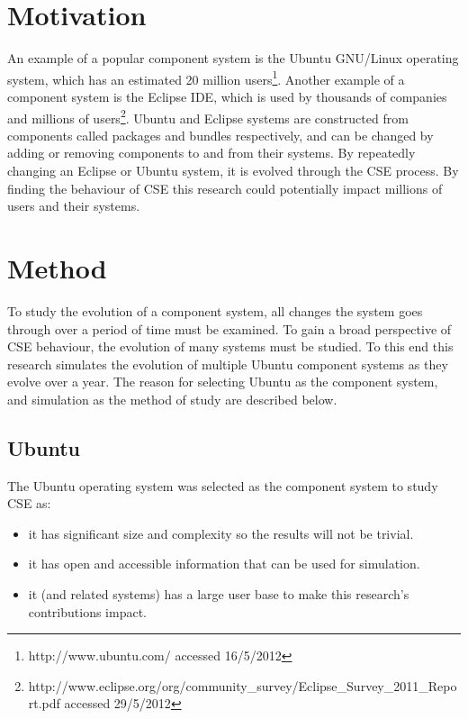 \section{Motivation}
An example of a popular component system is the Ubuntu GNU/Linux operating system, which has an estimated 20 million users\footnote{http://www.ubuntu.com/ accessed 16/5/2012}. 
Another example of a component system is the Eclipse IDE, which is used by thousands of companies and millions of users\footnote{http://www.eclipse.org/org/community\_survey/Eclipse\_Survey\_2011\_Report.pdf  accessed 29/5/2012}.
Ubuntu and Eclipse systems are constructed from components called packages and bundles respectively, 
and can be changed by adding or removing components to and from their systems.
By repeatedly changing an Eclipse or Ubuntu system, it is evolved through the CSE process.
By finding the behaviour of CSE this research could potentially impact millions of users and their systems.

\section{Method}
To study the evolution of a component system, all changes the system goes through over a period of time must be examined. 
To gain a broad perspective of CSE behaviour, the evolution of many systems must be studied.
To this end this research simulates the evolution of multiple Ubuntu component systems as they evolve over a year.
The reason for selecting Ubuntu as the component system, and simulation as the method of study are described below.

\subsection{Ubuntu}
The Ubuntu operating system was selected as the component system to study CSE as:
\begin{itemize}
  \item it has significant size and complexity so the results will not be trivial.
  \item it has open and accessible information that can be used for simulation.
  \item it (and related systems) has a large user base to make this research's contributions impact.
\end{itemize} 


